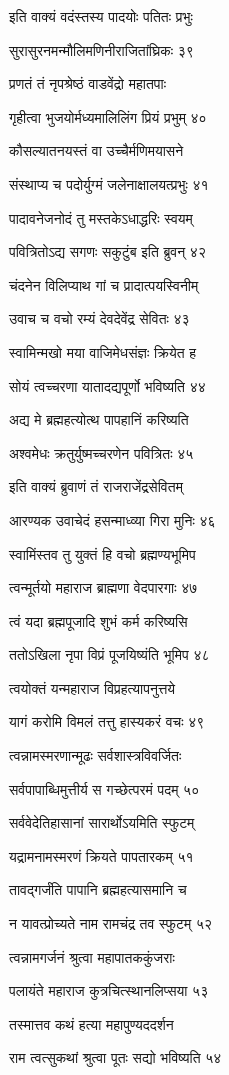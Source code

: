इति वाक्यं वदंस्तस्य पादयोः पतितः प्रभुः

सुरासुरनमन्मौलिमणिनीराजितांघ्रिकः ३९

प्रणतं तं नृपश्रेष्ठं वाडवेंद्रो महातपाः

गृहीत्वा भुजयोर्मध्यमालिलिंग प्रियं प्रभुम् ४०

कौसल्यातनयस्तं वा उच्चैर्मणिमयासने

संस्थाप्य च पदोर्युग्मं जलेनाक्षालयत्प्रभुः ४१

पादावनेजनोदं तु मस्तकेऽधाद्धरिः स्वयम्

पवित्रितोऽद्य सगणः सकुटुंब इति ब्रुवन् ४२

चंदनेन विलिप्याथ गां च प्रादात्पयस्विनीम्

उवाच च वचो रम्यं देवदेवेंद्र सेवितः ४३

स्वामिन्मखो मया वाजिमेधसंज्ञः क्रियेत ह

सोयं त्वच्चरणा यातादद्यपूर्णो भविष्यति ४४

अद्य मे ब्रह्महत्योत्थ पापहानिं करिष्यति

अश्वमेधः क्रतुर्युष्मच्चरणेन पवित्रितः ४५

इति वाक्यं ब्रुवाणं तं राजराजेंद्रसेवितम्

आरण्यक उवाचेदं हसन्माध्व्या गिरा मुनिः ४६

स्वामिंस्तव तु युक्तं हि वचो ब्रह्मण्यभूमिप

त्वन्मूर्तयो महाराज ब्राह्मणा वेदपारगाः ४७

त्वं यदा ब्रह्मपूजादि शुभं कर्म करिष्यसि

ततोऽखिला नृपा विप्रं पूजयिष्यंति भूमिप ४८

त्वयोक्तं यन्महाराज विप्रहत्यापनुत्तये

यागं करोमि विमलं तत्तु हास्यकरं वचः ४९

त्वन्नामस्मरणान्मूढः सर्वशास्त्रविवर्जितः

सर्वपापाब्धिमुत्तीर्य स गच्छेत्परमं पदम् ५०

सर्ववेदेतिहासानां सारार्थोऽयमिति स्फुटम्

यद्रामनामस्मरणं क्रियते पापतारकम् ५१

तावद्गर्जंति पापानि ब्रह्महत्यासमानि च

न यावत्प्रोच्यते नाम रामचंद्र तव स्फुटम् ५२

त्वन्नामगर्जनं श्रुत्वा महापातककुंजराः

पलायंते महाराज कुत्रचित्स्थानलिप्सया ५३

तस्मात्तव कथं हत्या महापुण्यददर्शन

राम त्वत्सुकथां श्रुत्वा पूतः सद्यो भविष्यति ५४

